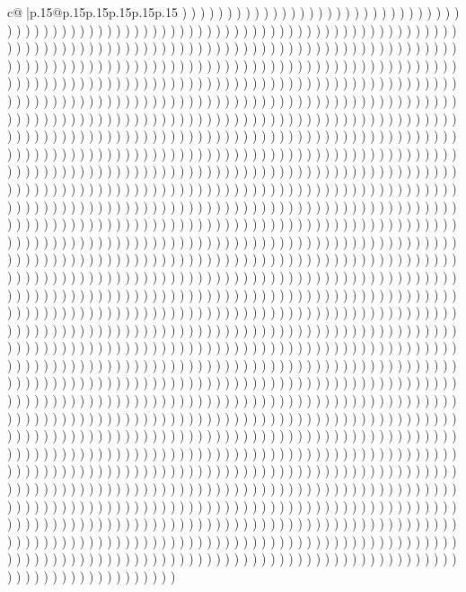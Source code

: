 \documentclass{article}
\begin{document}
{\begin{supertabular}{c@{$\;$}|p{.15\linewidth}@{}p{.15\linewidth}p{.15\linewidth}p{.15\linewidth}p{.15\linewidth}p{.15\linewidth}}
{{{) ) ) ) ) ) ) ) ) ) ) ) ) ) ) ) ) ) ) ) ) ) ) ) ) ) ) ) ) ) ) ) ) ) ) ) ) ) ) ) ) ) ) ) ) ) ) ) ) ) ) ) ) ) ) ) ) ) ) ) ) ) ) ) ) ) ) ) ) ) ) ) ) ) ) ) ) ) ) ) ) ) ) ) ) ) ) ) ) ) ) ) ) ) ) ) ) ) ) ) ) ) ) ) ) ) ) ) ) ) ) ) ) ) ) ) ) ) ) ) ) ) ) ) ) ) ) ) ) ) ) ) ) ) ) ) ) ) ) ) ) ) ) ) ) ) ) ) ) ) ) ) ) ) ) ) ) ) ) ) ) ) ) ) ) ) ) ) ) ) ) ) ) ) ) ) ) ) ) ) ) ) ) ) ) ) ) ) ) ) ) ) ) ) ) ) ) ) ) ) ) ) ) ) ) ) ) ) ) ) ) ) ) ) ) ) ) ) ) ) ) ) ) ) ) ) ) ) ) ) ) ) ) ) ) ) ) ) ) ) ) ) ) ) ) ) ) ) ) ) ) ) ) ) ) ) ) ) ) ) ) ) ) ) ) ) ) ) ) ) ) ) ) ) ) ) ) ) ) ) ) ) ) ) ) ) ) ) ) ) ) ) ) ) ) ) ) ) ) ) ) ) ) ) ) ) ) ) ) ) ) ) ) ) ) ) ) ) ) ) ) ) ) ) ) ) ) ) ) ) ) ) ) ) ) ) ) ) ) ) ) ) ) ) ) ) ) ) ) ) ) ) ) ) ) ) ) ) ) ) ) ) ) ) ) ) ) ) ) ) ) ) ) ) ) ) ) ) ) ) ) ) ) ) ) ) ) ) ) ) ) ) ) ) ) ) ) ) ) ) ) ) ) ) ) ) ) ) ) ) ) ) ) ) ) ) ) ) ) ) ) ) ) ) ) ) ) ) ) ) ) ) ) ) ) ) ) ) ) ) ) ) ) ) ) ) ) ) ) ) ) ) ) ) ) ) ) ) ) ) ) ) ) ) ) ) ) ) ) ) ) ) ) ) ) ) ) ) ) ) ) ) ) ) ) ) ) ) ) ) ) ) ) ) ) ) ) ) ) ) ) ) ) ) ) ) ) ) ) ) ) ) ) ) ) ) ) ) ) ) ) ) ) ) ) ) ) ) ) ) ) ) ) ) ) ) ) ) ) ) ) ) ) ) ) ) ) ) ) ) ) ) ) ) ) ) ) ) ) ) ) ) ) ) ) ) ) ) ) ) ) ) ) ) ) ) ) ) ) ) ) ) ) ) ) ) ) ) ) ) ) ) ) ) ) ) ) ) ) ) ) ) ) ) ) ) ) ) ) ) ) ) ) ) ) ) ) ) ) ) ) ) ) ) ) ) ) ) ) ) ) ) ) ) ) ) ) ) ) ) ) ) ) ) ) ) ) ) ) ) ) ) ) ) ) ) ) ) ) ) ) ) ) ) ) ) ) ) ) ) ) ) ) ) ) ) ) ) ) ) ) ) ) ) ) ) ) ) ) ) ) ) ) ) ) ) ) ) ) ) ) ) ) ) ) ) ) ) ) ) ) ) ) ) ) ) ) ) ) ) ) ) ) ) ) ) ) ) ) ) ) ) ) ) ) ) ) ) ) ) ) ) ) ) ) ) ) ) ) ) ) ) ) ) ) ) ) ) ) ) ) ) ) ) ) ) ) ) ) ) ) ) ) ) ) ) ) ) ) ) ) ) ) ) ) ) ) ) ) ) ) ) ) ) ) ) ) ) ) ) ) ) ) ) ) ) ) ) ) ) ) ) ) ) ) ) ) ) ) ) ) ) ) ) ) ) ) ) ) ) ) ) ) ) ) ) ) ) ) ) ) ) ) ) ) ) ) ) ) ) ) ) ) ) ) ) ) ) ) ) ) ) ) ) ) ) ) ) ) ) ) ) ) ) ) ) ) ) ) ) ) ) ) ) ) ) ) ) ) ) ) ) ) ) ) ) ) ) ) ) ) ) ) ) ) ) ) ) ) ) ) ) ) ) ) ) ) ) ) ) ) ) ) ) ) ) ) ) ) ) ) ) ) ) ) ) ) ) ) ) ) ) ) ) ) ) ) ) ) ) ) ) ) ) ) ) ) ) ) ) ) ) ) ) ) ) ) ) ) ) ) ) ) ) ) ) ) ) ) ) ) ) ) ) ) ) ) ) ) ) ) ) ) ) ) ) ) ) ) ) ) ) ) ) ) ) ) ) ) ) ) ) ) ) ) ) ) ) ) ) ) ) ) ) ) ) ) ) ) ) ) ) ) ) ) ) ) ) ) ) ) ) ) ) ) ) ) ) ) ) ) ) ) ) ) ) ) ) ) ) ) ) ) ) ) ) ) ) ) ) ) ) ) ) ) ) ) ) ) ) ) ) ) ) ) ) ) ) ) ) ) ) ) ) ) ) ) ) ) ) ) ) ) ) ) ) ) ) ) ) ) ) ) ) ) ) ) ) ) ) ) ) ) ) ) ) ) ) ) ) ) ) ) ) ) ) ) ) ) ) ) ) ) ) ) ) ) ) ) ) ) ) ) ) ) ) ) ) ) ) ) ) ) ) ) ) ) ) ) ) ) ) ) ) ) ) ) ) ) ) ) ) ) ) ) ) ) ) ) ) ) ) ) ) ) ) ) ) ) ) ) ) ) ) ) ) ) ) ) ) ) ) ) ) ) ) ) ) ) ) ) ) ) ) ) ) ) ) ) ) ) ) ) ) ) ) ) ) ) ) ) ) ) ) ) ) ) ) ) ) ) ) ) ) ) ) ) ) ) ) ) ) ) ) ) ) ) ) ) ) ) ) ) ) ) ) ) ) ) ) ) ) ) ) ) ) ) ) ) ) ) ) ) ) ) ) ) ) ) ) ) ) ) ) ) ) ) ) ) ) ) ) ) ) ) ) ) ) ) ) ) ) ) ) ) ) ) ) ) ) ) ) ) ) ) ) ) ) ) ) ) ) ) ) ) ) ) ) ) ) ) ) ) ) ) ) ) ) ) ) ) ) ) ) ) ) ) ) ) ) ) ) ) ) ) ) ) ) ) ) ) ) ) ) ) ) ) ) ) ) ) ) ) ) ) ) ) ) ) ) ) ) ) ) ) ) ) ) ) ) ) ) ) ) ) ) ) ) ) ) ) ) ) ) ) ) ) ) ) ) ) ) ) ) ) ) ) ) ) ) ) ) ) ) ) ) ) ) ) ) ) ) ) ) ) ) ) ) ) ) ) ) ) ) ) ) ) ) ) ) ) ) ) ) ) ) ) ) ) ) ) ) ) ) ) ) ) ) ) ) ) ) ) ) ) ) ) ) ) ) ) ) ) ) ) ) ) ) ) ) ) ) ) ) ) ) ) ) ) ) ) ) ) ) ) ) ) ) ) ) ) ) ) ) ) ) ) ) ) ) ) ) ) ) ) ) ) ) ) ) ) ) ) ) ) ) ) ) ) ) ) ) ) ) ) ) ) ) ) ) ) ) ) ) ) ) ) ) ) ) ) ) ) ) ) ) ) ) ) ) ) ) ) ) ) ) ) ) ) ) }}}
\end{supertabular}}
\end{document}
